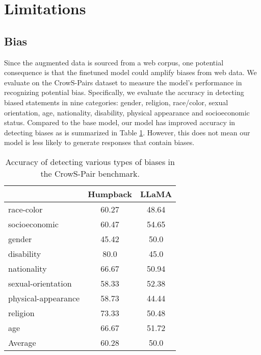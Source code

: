 \appendix


\section{Limitations}
\subsection{Bias}
Since the augmented data is sourced from a web corpus, one potential consequence is that the finetuned model could amplify biases from web data. We evaluate on the CrowS-Pairs dataset \cite{nangia2020crows} to measure the model's performance in recognizing potential bias. Specifically, we evaluate the accuracy in detecting biased statements in nine categories: gender, religion, race/color, sexual orientation, age, nationality, disability, physical appearance and socioeconomic status.  Compared to the base model, our model has improved accuracy in detecting biases as is summarized in Table \ref{tab:crows}. However, this does not mean our model is less likely to generate responses that contain biases.


\begin{table}[h]
      \caption{Accuracy of detecting various types of biases in the CrowS-Pair benchmark.
      \label{tab:crows}
      }
  \centering
  \begin{tabular}{lcc}
    \toprule
         &  Humpback & LLaMA \\
    \midrule
race-color & 60.27 & 48.64  \\
socioeconomic & 60.47 & 54.65 \\
gender & 45.42 & 50.0 \\
disability & 80.0 & 45.0 \\
nationality & 66.67 & 50.94 \\
sexual-orientation & 58.33 & 52.38 \\
physical-appearance & 58.73 & 44.44 \\
religion & 73.33 & 50.48 \\
age & 66.67 & 51.72 \\
    \midrule
    Average & 60.28 & 50.0   \\
    \bottomrule
  \end{tabular}
\vspace{1mm}

\end{table}


